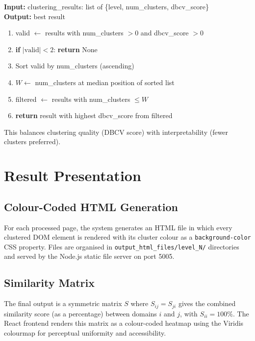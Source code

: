 \begin{tcolorbox}[colback=gray!5!white, colframe=gray!60!black,
    title=\textbf{Algorithm: Best Clustering Level Selection}, fonttitle=\bfseries,
    enhanced, arc=2mm, boxrule=0.5pt]
\textbf{Input:} clustering\_results: list of \{level, num\_clusters, dbcv\_score\}\\
\textbf{Output:} best result
\begin{enumerate}
    \item valid $\leftarrow$ results with num\_clusters $> 0$ and dbcv\_score $> 0$
    \item \textbf{if} $|\text{valid}| < 2$: \textbf{return} None
    \item Sort valid by num\_clusters (ascending)
    \item $W \leftarrow$ num\_clusters at median position of sorted list
    \item filtered $\leftarrow$ results with num\_clusters $\leq W$
    \item \textbf{return} result with highest dbcv\_score from filtered
\end{enumerate}
\end{tcolorbox}

This balances clustering quality (DBCV score) with interpretability (fewer clusters preferred).

\section{Result Presentation}
\label{sec:presentation}

\subsection{Colour-Coded HTML Generation}

For each processed page, the system generates an HTML file in which every clustered DOM element is rendered with its cluster colour as a \texttt{background-color} CSS property. Files are organised in \texttt{output\_html\_files/level\_N/} directories and served by the Node.js static file server on port 5005.

\subsection{Similarity Matrix}

The final output is a symmetric matrix $S$ where $S_{ij} = S_{ji}$ gives the combined similarity score (as a percentage) between domains $i$ and $j$, with $S_{ii} = 100\%$. The React frontend renders this matrix as a colour-coded heatmap using the Viridis colourmap for perceptual uniformity and accessibility.

